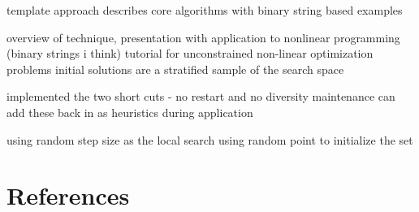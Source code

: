 \documentclass[a4paper, 11pt]{article}
\begin{document}
template approach describes core algorithms with binary string based examples \cite{Glover1998a}

overview of technique, presentation with application to nonlinear programming (binary strings i think) \cite{Glover2003b}
tutorial for unconstrained non-linear optimization problems
initial solutions are a stratified sample of the search space



implemented the two short cuts - no restart and no diversity maintenance
can add these back in as heuristics during application

using random step size as the local search
using random point to initialize the set






\section{References}
\label{sec:references}
\end{document}
